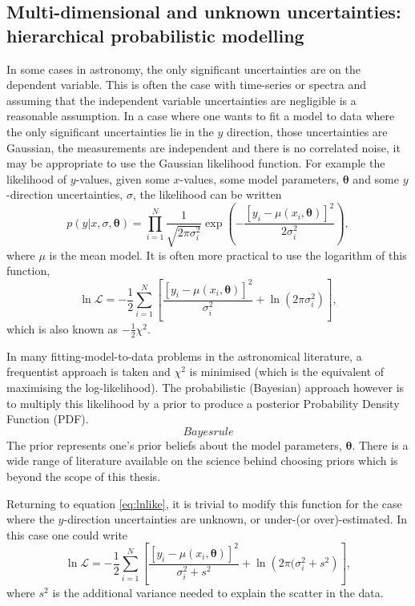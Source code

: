 \subsection{Multi-dimensional and unknown uncertainties: hierarchical
probabilistic modelling}
In some cases in astronomy, the only significant uncertainties are on
the dependent variable.
This is often the case with time-series or spectra and assuming that the
independent variable uncertainties are negligible is a reasonable assumption.
In a case where one wants to fit a model to data where the only significant
uncertainties lie in the $y$ direction, those uncertainties are Gaussian, the
measurements are independent and there is no correlated noise, it may be
appropriate to use the Gaussian likelihood function.
For example the likelihood of $y$-values, given some $x$-values, some model
parameters, $\mathbf{\theta}$ and some $y$-direction uncertainties, $\sigma$,
the likelihood can be written
\begin{equation}
    p(y|x, \sigma, \mathbf{\theta}) = \prod_{i=1}^N
    \frac{1}{\sqrt{2\pi\sigma_i^2}}
    \exp\left(-\frac{[y_i - \mu(x_i, \mathbf{\theta})]^2}{2\sigma_i^2}\right),
\end{equation}
where $\mu$ is the mean model.
It is often more practical to use the logarithm of this function,
\begin{equation}
    \ln\mathcal{L} =
    -\frac{1}{2} \sum_{i=1}^N \left[\frac{[y_i - \mu(x_i,
    \mathbf{\theta})]^2}{\sigma_i^2} +
    \ln\left(2\pi\sigma_i^2\right) \right],
\end{equation}
\label{eq:lnlike}
which is also known as $-\frac{1}{2}\chi^2$.

In many fitting-model-to-data problems in the astronomical literature,
a frequentist approach is taken and $\chi^2$ is minimised (which is the
equivalent of maximising the log-likelihood).
The probabilistic (Bayesian) approach however is to multiply this likelihood
by a prior to produce a posterior Probability Density Function (PDF).
\begin{equation}
Bayes rule
\end{equation}
The prior represents one's prior beliefs about the model parameters,
$\mathbf{\theta}$.
There is a wide range of literature available on the science behind choosing
priors which is beyond the scope of this thesis.

Returning to equation \ref{eq:lnlike}, it is trivial to modify this function
for the case where the $y$-direction uncertainties are unknown, or
under-(or over)-estimated.
In this case one could write
\begin{equation}
    \ln\mathcal{L} =
    -\frac{1}{2} \sum_{i=1}^N \left[\frac{[y_i - \mu(x_i,
    \mathbf{\theta})]^2}{\sigma_i^2 + s^2} +
    \ln\left(2\pi(\sigma_i^2 + s^2\right) \right],
\end{equation}
where $s^2$ is the additional variance needed to explain the scatter in the
data.

